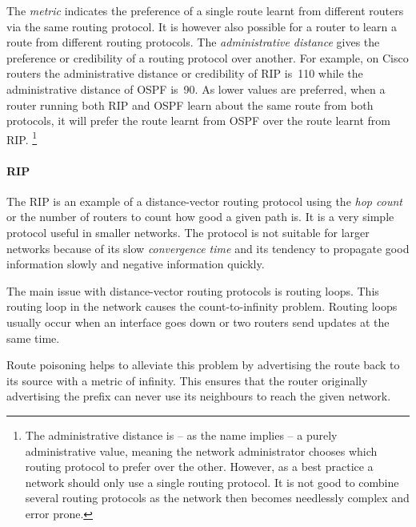 The \emph{metric} indicates the preference of a single route learnt from different routers via the same routing protocol.
It is however also possible for a router to learn a route from different routing protocols.
The \emph{administrative distance} gives the preference or credibility of a routing protocol over another.
For example, on Cisco routers the administrative distance or credibility of \acs{RIP} is~110 while the administrative distance of \acs{OSPF} is~90.
As lower values are preferred, when a router running both \acs{RIP} and \acs{OSPF} learn about the same route from both protocols, it will prefer the route learnt from \acs{OSPF} over the route learnt from \acs{RIP}.%
   \footnote{%
      The administrative distance is -- as the name implies -- a purely administrative value, meaning the network administrator chooses which routing protocol to prefer over the other.
      However, as a best practice a network should only use a single routing protocol.
      It is not good to combine several routing protocols as the network then becomes needlessly complex and error prone.
   }

\paragraph{\acf{RIP}}
The \acl{RIP} is an example of a distance-vector routing protocol using the \emph{hop count} or the number of routers to count how good a given path is.%
It is a very simple protocol useful in smaller networks.
The protocol is not suitable for larger networks because of its slow \emph{convergence time} and its tendency to propagate good information slowly and negative information quickly.

The main issue with distance-vector routing protocols is routing loops.%
This routing loop in the network causes the count-to-infinity problem.%
Routing loops usually occur when an interface goes down or two routers send updates at the same time.

Route poisoning helps to alleviate this problem by advertising the route back to its source with a metric of infinity.
This ensures that the router originally advertising the prefix can never use its neighbours to reach the given network.

